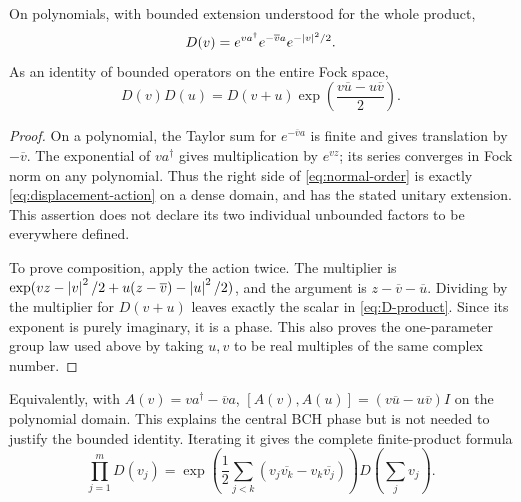 \begin{theorem}\label{thm:displacement}
On polynomials, with bounded extension understood for the whole product,
\begin{equation}\label{eq:normal-order}
 D(v)=e^{v a^\dagger}e^{-\overline v a}e^{-\left\lvert v\right\rvert^2/2}.
\end{equation}
As an identity of bounded operators on the entire Fock space,
\begin{equation}\label{eq:D-product}
 D(v)D(u)=D(v+u)
 \exp\left(\frac{v\overline u-u\overline v}{2}\right).
\end{equation}
\end{theorem}
\begin{proof}
On a polynomial, the Taylor sum for $e^{-\overline v a}$ is finite and gives translation by $-\overline v$. The exponential of $v a^\dagger$ gives multiplication by $e^{vz}$; its series converges in Fock norm on any polynomial. Thus the right side of \cref{eq:normal-order} is exactly \cref{eq:displacement-action} on a dense domain, and has the stated unitary extension. This assertion does not declare its two individual unbounded factors to be everywhere defined.

To prove composition, apply the action twice. The multiplier is
$\exp(vz-\left\lvert v\right\rvert^2/2+u(z-\overline v)-\left\lvert u\right\rvert^2/2)$,
and the argument is $z-\overline v-\overline u$. Dividing by the multiplier for $D(v+u)$ leaves exactly the scalar in \cref{eq:D-product}. Since its exponent is purely imaginary, it is a phase. This also proves the one-parameter group law used above by taking $u,v$ to be real multiples of the same complex number.
\end{proof}
Equivalently, with $A(v)=v a^\dagger-\overline v a$,
$[A(v),A(u)]=(v\overline u-u\overline v)I$ on the polynomial domain. This explains the central BCH phase but is not needed to justify the bounded identity. Iterating it gives the complete finite-product formula
\begin{equation}\label{eq:D-many}
 \prod_{j=1}^m D(v_j)
 =\exp\left(\frac12\sum_{j<k}
 (v_j\overline{v_k}-v_k\overline{v_j})\right)
 D\left(\sum_jv_j\right).
\end{equation}

